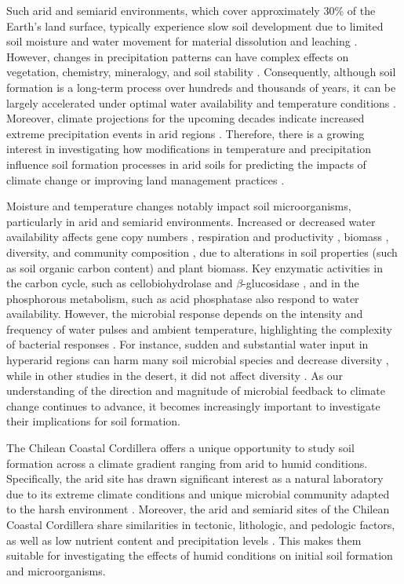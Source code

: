 Such arid and semiarid environments, which cover approximately 30\% of the Earth’s land surface, typically experience slow soil development due to limited soil moisture and water movement for material dissolution and leaching \citep{Abdelfattah2013, Sousa2021}. However, changes in precipitation patterns can have complex effects on vegetation, chemistry, mineralogy, and soil stability \citep{Su2010, Wang2017, Sousa2021}. Consequently, although soil formation is a long-term process over hundreds and thousands of years, it can be largely accelerated under optimal water availability and temperature conditions \citep{Buchan2011, Szalai2021}. Moreover, climate projections for the upcoming decades indicate increased extreme precipitation events in arid regions \citep{Donat2016, Ortega2019}. Therefore, there is a growing interest in investigating how modifications in temperature and precipitation influence soil formation processes in arid soils for predicting the impacts of climate change or improving land management practices \citep{Gelybo2018}.

Moisture and temperature changes notably impact soil microorganisms, particularly in arid and semiarid environments. Increased or decreased water availability affects gene copy numbers \citep{Barnard2013}, respiration and productivity \citep{Armstrong2016}, biomass \citep{Na2019, Ouyang2020}, diversity, and community composition \citep{Maestre2015, StovicekB2017}, due to alterations in soil properties (such as soil organic carbon content) and plant biomass. Key enzymatic activities in the carbon cycle, such as cellobiohydrolase and $\beta$-glucosidase \citep{Ouyang2020}, and in the phosphorous metabolism, such as acid phosphatase \citep{Na2019} also respond to water availability. However, the microbial response depends on the intensity and frequency of water pulses and ambient temperature, highlighting the complexity of bacterial responses \citep{StovicekA2017}. For instance, sudden and substantial water input in hyperarid regions can harm many soil microbial species and decrease diversity \citep{AzuaBustos2018}, while in other studies in the desert, it did not affect diversity \citep{Armstrong2016}. As our understanding of the direction and magnitude of microbial feedback to climate change continues to advance, it becomes increasingly important to investigate their implications for soil formation.

The Chilean Coastal Cordillera offers a unique opportunity to study soil formation across a climate gradient ranging from arid to humid conditions. Specifically, the arid site has drawn significant interest as a natural laboratory due to its extreme climate conditions and unique microbial community adapted to the harsh environment \citep{Genderjahn2018, SchulzeMakuch2018, Aguilera2021, Genderjahn2021, SchulzeMakuch2021}. Moreover, the arid and semiarid sites of the Chilean Coastal Cordillera share similarities in tectonic, lithologic, and pedologic factors, as well as low nutrient content and precipitation levels \citep{Bernhard2018, Oeser2018}. This makes them suitable for investigating the effects of humid conditions on initial soil formation and microorganisms.

